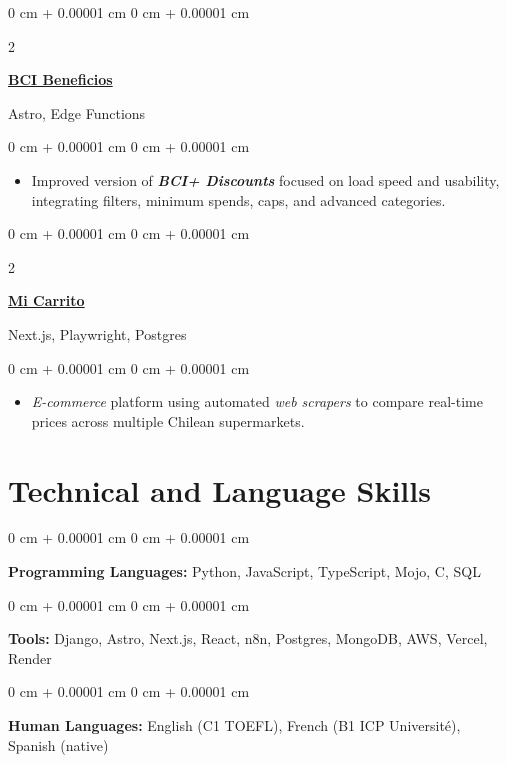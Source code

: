 \documentclass[10pt, letterpaper]{article}
\newenvironment{highlights}{
    \begin{itemize}[
        topsep=0.10 cm,
        parsep=0.10 cm,
        partopsep=0pt,
        itemsep=0pt,
        leftmargin=0 cm + 10pt
    ]
}{
    \end{itemize}
} %
\newenvironment{onecolentry}{
    \begin{adjustwidth}{
        0 cm + 0.00001 cm
    }{
        0 cm + 0.00001 cm
    }
}{
    \end{adjustwidth}
} %
\newenvironment{twocolentry}[2][]{
    \onecolentry
    \def\secondColumn{#2}
    \setcolumnwidth{\fill, 4.5 cm}
    \begin{paracol}{2}
}{
    \switchcolumn \raggedleft \secondColumn
    \end{paracol}
    \endonecolentry
} %
\let\hrefWithoutArrow\href
\begin{document}
    \begin{twocolentry}{Astro, Edge Functions}
        \textbf{\href{https://bcibeneficios.onrender.com/}{BCI Beneficios}}
    \end{twocolentry}
    \vspace{0.10 cm}
    \begin{onecolentry}
        \begin{highlights}
            \item Improved version of \textbf{\textit{BCI+ Discounts} }focused on load speed and usability, integrating filters, minimum spends, caps, and advanced categories.
        \end{highlights}
    \end{onecolentry}
    \vspace{0.2 cm}


    \begin{twocolentry}{Next.js, Playwright, Postgres}
        \textbf{\hrefWithoutArrow{https://micarritochile.vercel.app/}{Mi Carrito}}
    \end{twocolentry}
    \vspace{0.10 cm}
    \begin{onecolentry}
        \begin{highlights}
            \item \textit{E-commerce} platform using automated \textit{web scrapers} to compare real-time prices across multiple Chilean supermarkets.
        \end{highlights}
    \end{onecolentry}


    \section{Technical and Language Skills}

    \begin{onecolentry}
        \textbf{Programming Languages:} Python, JavaScript, TypeScript, Mojo, C, SQL
    \end{onecolentry}
    \vspace{0.1 cm}
    \begin{onecolentry}
        \textbf{Tools:} Django, Astro, Next.js, React, n8n, Postgres, MongoDB, AWS, Vercel, Render
    \end{onecolentry}
    \vspace{0.1 cm}
    \begin{onecolentry}
        \textbf{Human Languages:} English (C1 TOEFL), French (B1 ICP Université), Spanish (native)
    \end{onecolentry}
\end{document}

